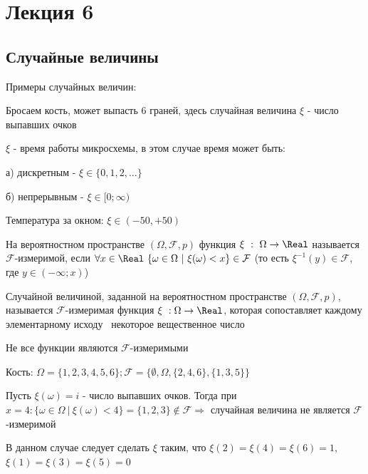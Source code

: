\documentclass[12pt]{article}
\begin{document}

    \section{Лекция 6}

    \subsection{Случайные величины}

    Примеры случайных величин:

     Бросаем кость, может выпасть 6 граней, здесь случайная величина $\xi$ - число выпавших очков

     $\xi$ - время работы микросхемы, в этом случае время может быть:

    а) дискретным - $\xi \in \{0, 1, 2, \dots\}$

    б) непрерывным - $\xi \in [0; \infty)$

     Температура за окном: $\xi \in (-50, +50)$

    \hypertarget{measurabilityoffunction}{}

    \Def На вероятностном пространстве $(\Omega, \mathcal{F}, p)$ функция $\xi \ : \ \Omega \to \Real$ называется
    $\mathcal{F}$-измеримой, если $\forall x \in \Real \ \{\omega \in \Omega \ | \ \xi(\omega) < x\} \in \mathcal{F}$
    (то есть $\xi^{-1}(y) \in \mathcal{F}$, где $y \in (-\infty; x)$)

    \hypertarget{randomvaluedefinition}{}

    \Def Случайной величиной, заданной на вероятностном пространстве $(\Omega, \mathcal{F}, p)$, называется
    $\mathcal{F}$-измеримая функция $\xi \ : \Omega \to \Real$, которая сопоставляет каждому элементарному исходу \
    некоторое вещественное число

    \Nota Не все функции являются $\mathcal{F}$-измеримыми

    \Exs Кость: $\Omega = \{1, 2, 3, 4, 5, 6\}; \mathcal{F} = \{\emptyset, \Omega, \{2, 4, 6\}, \{1, 3, 5\}\}$

    Пусть $\xi(\omega) = i$ - число выпавших очков. Тогда при $x = 4: \{\omega \in \Omega \ | \ \xi (\omega) < 4\} = \{1, 2, 3\} \notin \mathcal{F} \Longrightarrow$ случайная величина не является $\mathcal{F}$-измеримой

    В данном случае следует сделать $\xi$ таким, что $\xi(2) = \xi(4) = \xi(6) = 1$, $\xi(1) = \xi(3) = \xi(5) = 0$
\end{document}
